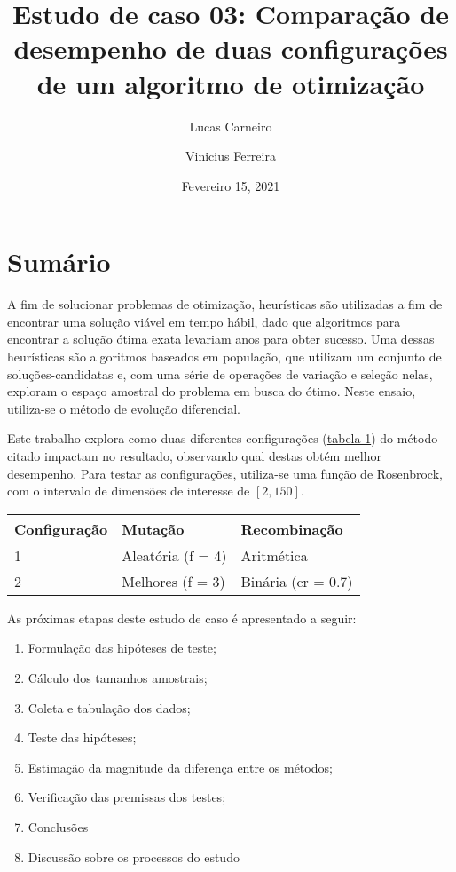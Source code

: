 \documentclass[
]{article}
\title{Estudo de caso 03: Comparação de desempenho de duas configurações
de um algoritmo de otimização}
\author{Lucas Carneiro \and Vinicius Ferreira}
\date{Fevereiro 15, 2021}
\providecommand{\tightlist}{%
  \setlength{\itemsep}{0pt}\setlength{\parskip}{0pt}}
\begin{document}
\maketitle

\hypertarget{sumuxe1rio}{%
\section{Sumário}\label{sumuxe1rio}}

A fim de solucionar problemas de otimização, heurísticas são utilizadas
a fim de encontrar uma solução viável em tempo hábil, dado que
algoritmos para encontrar a solução ótima exata levariam anos para obter
sucesso. Uma dessas heurísticas são algoritmos baseados em população,
que utilizam um conjunto de soluções-candidatas e, com uma série de
operações de variação e seleção nelas, exploram o espaço amostral do
problema em busca do ótimo. Neste ensaio, utiliza-se o método de
evolução diferencial.

Este trabalho explora como duas diferentes configurações
(\protect\hyperlink{tabel1}{tabela 1}) do método citado impactam no
resultado, observando qual destas obtém melhor desempenho. Para testar
as configurações, utiliza-se uma função de Rosenbrock, com o intervalo
de dimensões de interesse de \([2,150]\).

\begin{longtable}[]{@{}lll@{}}
\toprule
Configuração & Mutação & Recombinação\tabularnewline
\midrule
\endhead
1 & Aleatória (f = 4) & Aritmética\tabularnewline
2 & Melhores (f = 3) & Binária (cr = 0.7)\tabularnewline
\bottomrule
\end{longtable}

As próximas etapas deste estudo de caso é apresentado a seguir:

\begin{enumerate}
\def\labelenumi{\arabic{enumi}.}
\tightlist
\item
  Formulação das hipóteses de teste;
\item
  Cálculo dos tamanhos amostrais;
\item
  Coleta e tabulação dos dados;
\item
  Teste das hipóteses;
\item
  Estimação da magnitude da diferença entre os métodos;
\item
  Verificação das premissas dos testes;
\item
  Conclusões
\item
  Discussão sobre os processos do estudo
\end{enumerate}
\end{document}
